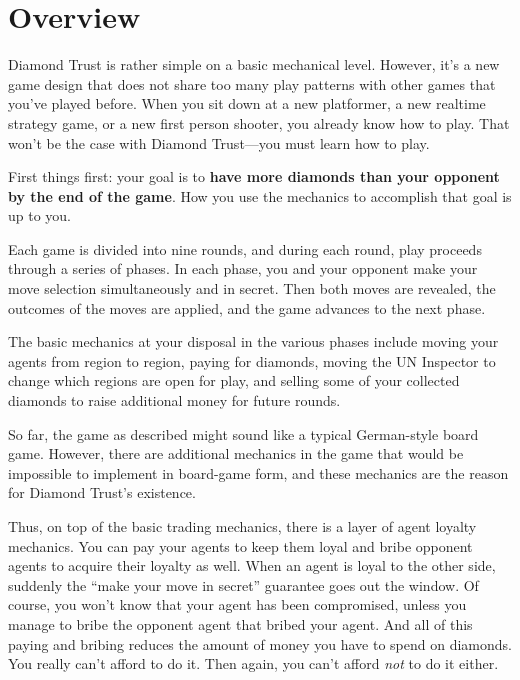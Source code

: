 \documentclass[8pt]{extbook}
\begin{document}
\makeatletter
\renewcommand\@endpart{\standardEndPart}
\makeatother





\section{Overview}
Diamond Trust is rather simple on a basic mechanical level.  However, it's a new game design that does not share too many play patterns with other games that you've played before.  When you sit down at a new platformer, a new realtime strategy game, or a new first person shooter, you already know how to play.  That won't be the case with Diamond Trust---you must learn how to play.

First things first:  your goal is to {\bf have more diamonds than your opponent by the end of the game}.  How you use the mechanics to accomplish that goal is up to you.

Each game is divided into nine rounds, and during each round, play proceeds through a series of phases.  In each phase, you and your opponent make your move selection simultaneously and in secret.  Then both moves are revealed, the outcomes of the moves are applied, and the game advances to the next phase.

The basic mechanics at your disposal in the various phases include moving your agents from region to region, paying for diamonds, moving the UN Inspector to change which regions are open for play, and selling some of your collected diamonds to raise additional money for future rounds.

So far, the game as described might sound like a typical German-style board game.  However, there are additional mechanics in the game that would be impossible to implement in board-game form, and these mechanics are the reason for Diamond Trust's existence.

Thus, on top of the basic trading mechanics, there is a layer of agent loyalty mechanics.  You can pay your agents to keep them loyal and bribe opponent agents to acquire their loyalty as well.  When an agent is loyal to the other side, suddenly the ``make your move in secret'' guarantee goes out the window.  Of course, you won't know that your agent has been compromised, unless you manage to bribe the opponent agent that bribed your agent.  And all of this paying and bribing reduces the amount of money you have to spend on diamonds.  You really can't afford to do it.  Then again, you can't afford {\it not} to do it either.
\end{document}
